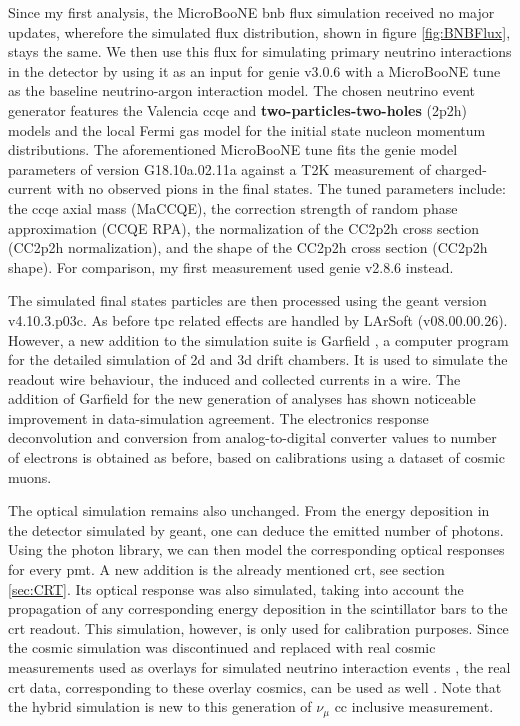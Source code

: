 Since my first analysis, the MicroBooNE \gls{bnb} flux simulation received no major updates, wherefore the simulated flux distribution, shown in figure \ref{fig:BNBFlux}, stays the same. We then use this flux for simulating primary neutrino interactions in the detector by using it as an input for \gls{genie} v3.0.6 with a MicroBooNE tune as the baseline neutrino-argon interaction model. The chosen neutrino event generator features the Valencia \gls{ccqe} and \textbf{two-particles-two-holes} (2p2h) models and the local Fermi gas model for the initial state nucleon momentum distributions. The aforementioned MicroBooNE tune fits the \gls{genie} model parameters of version G18.10a.02.11a against a T2K measurement of charged-current with no observed pions in the final states. The tuned parameters include: the \gls{ccqe} axial mass (MaCCQE), the correction strength of random phase approximation (CCQE RPA), the normalization of the CC2p2h cross section (CC2p2h normalization), and the shape of the CC2p2h cross section (CC2p2h shape). For comparison, my first measurement used \gls{genie} v2.8.6 instead.

The simulated final states particles are then processed using the \gls{geant} version v4.10.3.p03c. As before \gls{tpc} related effects are handled by \gls{LArSoft} (v08.00.00.26). However, a new addition to the simulation suite is Garfield \cite{Garfield}, a computer program for the detailed simulation of \gls{2d} and \mbox{\gls{3d}} drift chambers. It is used to simulate the readout wire behaviour, \ie the induced and collected currents in a wire. The addition of Garfield for the new generation of analyses has shown noticeable improvement in data-simulation agreement. The electronics response deconvolution and conversion from analog-to-digital converter values to number of electrons is obtained as before, based on calibrations using a dataset of cosmic muons.

The optical simulation remains also unchanged. From the energy deposition in the detector simulated by \gls{geant}, one can deduce the emitted number of photons. Using the photon library, we can then model the corresponding optical responses for every \gls{pmt}. A new addition is the already mentioned \gls{crt}, see section \ref{sec:CRT}. Its optical response was also simulated, taking into account the propagation of any corresponding energy deposition in the scintillator bars to the \gls{crt} readout. This simulation, however, is only used for calibration purposes. Since the cosmic simulation was discontinued and replaced with real cosmic measurements used as overlays for simulated neutrino interaction events \cite{MicroBooNEOverlayIN}, the real \gls{crt} data, corresponding to these overlay cosmics, can be used as well \cite{CRTThomasPhD}. Note that the hybrid simulation is new to this generation of $\nu_{\mu}$ \gls{cc} inclusive measurement.

